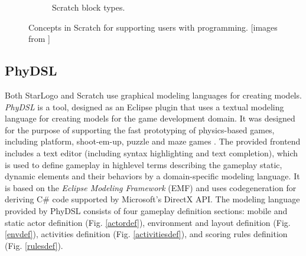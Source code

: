 \documentclass[runningheads,a4paper]{llncs}
\begin{document}
\begin{figure}[ht]
\begin{subfigure}[t]{0.9\textwidth}
\caption{Scratch block types.}\end{subfigure}
\caption{Concepts in Scratch for supporting users with programming. [images from \cite{maloney2010scratch}]}
\end{figure}

  \subsection{PhyDSL}
  \label{subsection:PhyDSL}
  Both StarLogo and Scratch use graphical modeling languages for creating models. 
  \emph{PhyDSL} is a tool, designed as an Eclipse plugin that uses a textual modeling language for creating models for the game development domain.
  It was designed for the purpose of supporting the fast prototyping of physics-based games, including platform, shoot-em-up, 
  puzzle and maze games \cite{guana2014phydsl}. 
  The provided frontend includes a text editor (including syntax highlighting and text completion), which is used to define gameplay in highlevel
  terms describing the gameplay static, dynamic elements and their behaviors by a domain-specific modeling language.  
  It is based on the \emph{Eclipse Modeling Framework} \cite{gronback2009eclipse} (EMF) and uses codegeneration for deriving C\# code supported by Microsoft’s
  DirectX API. 
  The modeling language provided by PhyDSL consists of four gameplay definition sections: mobile and
  static actor definition (Fig. \ref{actordef}), 
  environment and layout definition (Fig. \ref{envdef}), 
  activities definition (Fig. \ref{activitiesdef}), 
  and scoring rules definition (Fig. \ref{rulesdef}).
  
\end{document}
